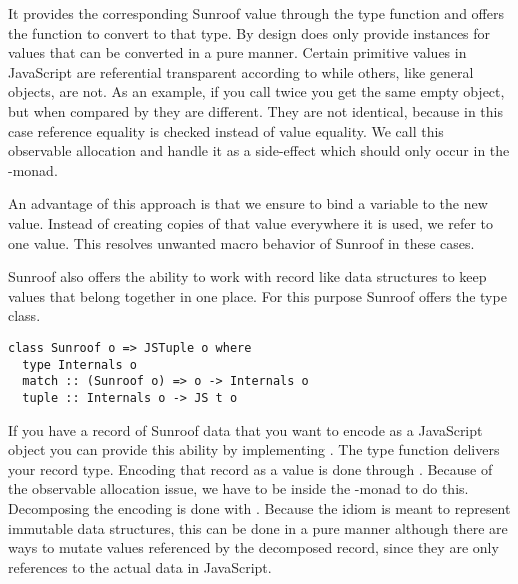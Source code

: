 It provides the corresponding Sunroof value through the type function
  and offers the function 
 to convert to that type. By design  does
only provide instances for values that can be converted in a pure
manner. Certain primitive values in JavaScript are referential 
transparent according to \Src{==} while others, like general objects,
are not. As an example, if you call  twice you get the 
same empty object, but when compared by \Src{==} they are different. They
are not identical, because in this case reference equality is checked
instead of value equality. We call this observable allocation and handle 
it as a side-effect which should only occur in the \JS-monad. 

An advantage of this approach is that we ensure to bind a variable to the 
new value. Instead of creating copies of that value everywhere
it is used, we refer to one value. This resolves 
unwanted macro behavior of Sunroof in these cases.

Sunroof also offers the ability to work with record like data structures to 
keep values that belong together in one place.
For this purpose Sunroof offers the  type class.
\begin{verbatim}
class Sunroof o => JSTuple o where
  type Internals o
  match :: (Sunroof o) => o -> Internals o
  tuple :: Internals o -> JS t o
\end{verbatim}
If you have a record of Sunroof data that you want to
encode as a JavaScript object you can provide this ability 
by implementing . The  type function
delivers your record type. Encoding that record as a 
value is done through . 
Because of the observable allocation issue, we have to be 
inside the \JS-monad to do this.
Decomposing the encoding is done with . Because the
 idiom is meant to represent immutable data structures, this 
can be done in a pure manner although there are ways to mutate 
values referenced by the decomposed record, since they are only 
references to the actual data in JavaScript.

